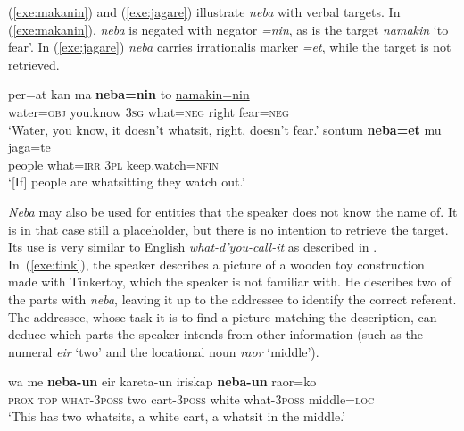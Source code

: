 \documentclass[output=paper,colorlinks,citecolor=brown
\ChapterDOI{10.5281/zenodo.15697587}
]{langscibook}
\begin{document}
(\ref{exe:makanin}) and (\ref{exe:jagare}) illustrate \textit{neba} with verbal targets. In (\ref{exe:makanin}), \textit{neba} is negated with negator \textit{=nin}, as is the target \textit{namakin} `to fear'. In (\ref{exe:jagare}) \textit{neba} carries irrationalis marker \textit{=et}, while the target is not retrieved.

\begin{exe}
    \ex \gll per=at kan ma \textbf{neba=nin} to \uline{namakin=nin}\\
    water=\textsc{obj} you.know \textsc{3sg} what=\textsc{neg} right fear=\textsc{neg}\\
    \glt `Water, you know, it doesn't whatsit, right, doesn't fear.' 
    \label{exe:makanin}
    \ex \gll sontum \textbf{neba=et} mu jaga=te\\
    people what=\textsc{irr} \textsc{3pl} keep.watch=\textsc{nfin}\\
    \glt `[If] people are whatsitting they watch out.' 
    \label{exe:jagare}
\end{exe}


\textit{Neba} may also be used for entities that the speaker does not know the name of. It is in that case still a placeholder, but there is no intention to retrieve the target. Its use is very similar to English \textit{what-d'you-call-it} as described in \cite{enfield2003definition}. In~(\ref{exe:tink}), the speaker describes a picture of a wooden toy construction made with Tinkertoy, which the speaker is not familiar with. He describes two of the parts with \textit{neba}, leaving it up to the addressee to identify the correct referent. The addressee, whose task it is to find a picture matching the description, can deduce which parts the speaker intends from other information (such as the numeral \textit{eir} `two' and the locational noun \textit{raor} `middle').

\begin{exe}
	\ex \gll wa me \textbf{neba-un} eir kareta-un iriskap \textbf{neba-un} raor=ko\\
	\textsc{prox} \textsc{top} \textsc{what-3poss} two cart-\textsc{3poss} white what-\textsc{3poss} middle=\textsc{loc}\\
	\glt `This has two whatsits, a white cart, a whatsit in the middle.' 
	\label{exe:tink}
\end{exe} 	
\end{document}
